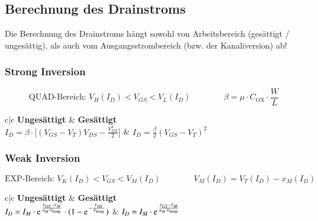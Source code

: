 \subsection{Berechnung des Drainstroms}


Die Berechnung des Drainstroms hängt sowohl von Arbeitsbereich (gesättigt / ungesättig), als auch vom Ausgangsstrombereich (bzw. der Kanaliversion) ab!


\subsubsection{Strong Inversion}

\vspace{-0.3cm}

$$ \boxed{ \text{QUAD-Bereich: } V_H(I_D) < V_{GS} < V_L(I_D) } \qquad \qquad \beta = \mu \cdot C_{\text{OX}} \cdot \frac{W}{L} $$


\renewcommand{\arraystretch}{1.5}
\begin{ctabular}{c|c}
    \textbf{Ungesättigt}                                                            & \textbf{Gesättigt}                        \\
    $I_D = \beta \cdot \bigg[ (V_{GS} - V_T) V_{DS} - \frac{V_{DS}^2}{2} \bigg]$    & $I_D = \frac{\beta}{2} (V_{GS} - V_T)^2$
\end{ctabular}
\renewcommand{\arraystretch}{1}



\subsubsection{Weak Inversion}

\vspace{-0.3cm}

$$ \boxed{ \text{EXP-Bereich: } V_K(I_D) < V_{GS} < V_M(I_D) \qquad \qquad V_M(I_D) = V_T(I_D) - x_M(I_D) } $$


\renewcommand{\arraystretch}{1.5}
\begin{ctabular}{c|c}
    \textbf{Ungesättigt}                                                                                                & \textbf{Gesättigt}                                                    \\
    $I_D = I_M \cdot \e^{\frac{V_{GS} - V_M}{n_M \cdot V_\text{temp}}} \cdot (1 - \e^{-\frac{V_{DS}}{V_\text{temp}}})$  & $I_D = I_M \cdot \e^{\frac{V_{GS} - V_M}{n_M \cdot V_\text{temp}}}$
\end{ctabular}
\renewcommand{\arraystretch}{1}


